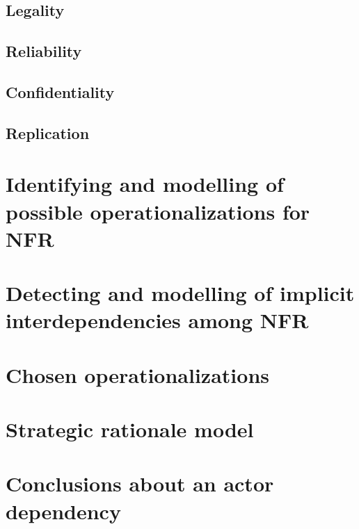 \documentclass{VUMIFPSkursinis}
\begin{document}
	\subsection{Legality}
	\subsection{Reliability}
	\subsection{Confidentiality}
	\subsection{Replication}

\section{Identifying and modelling of possible operationalizations for NFR}

\section{Detecting and modelling of implicit interdependencies among NFR}

\section{Chosen operationalizations}

\section{Strategic rationale model}

\section{Conclusions about an actor dependency}

\end{document}

